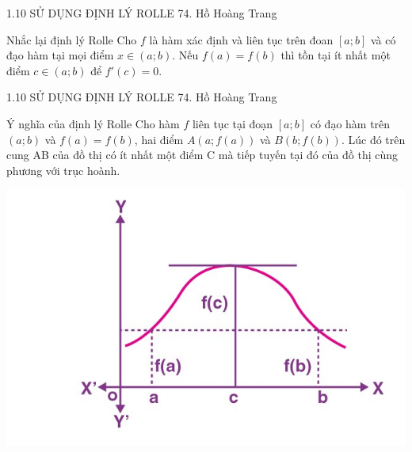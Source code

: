 \begin{frame}{1.10 SỬ DỤNG ĐỊNH LÝ ROLLE \hspace{4cm}  74. Hồ Hoàng Trang} 
	
		\begin{block}{Nhắc lại định lý Rolle}
			Cho $f$ là hàm xác định và liên tục trên đoan $\left[a;b\right]$ và có đạo hàm tại mọi điểm $x \in \left(a;b\right)$. Nếu $f(a)=f(b)$ thì tồn tại ít nhất một điểm $c\in \left(a;b\right)$ để $f'(c)=0$.
		\end{block}
\end{frame}
\begin{frame}{1.10 SỬ DỤNG ĐỊNH LÝ ROLLE \hspace{4cm}  74. Hồ Hoàng Trang}
		
			\begin{block}{Ý nghĩa của định lý Rolle}
				Cho hàm $f$ liên tục tại đoạn $\left[a;b\right]$ có đạo hàm trên $\left(a;b\right)$ và $f(a)=f(b)$, hai điểm $A(a;f(a))$ và $B(b;f(b))$. Lúc đó trên cung AB của đồ thị có ít nhất một điểm C mà tiếp tuyến tại đó của đồ thị cùng phương với trục hoành.
			\end{block}
\pause
\begin{center}
    \includegraphics[scale=0.5]{rolle.jpg}
\end{center}
		\end{frame}
